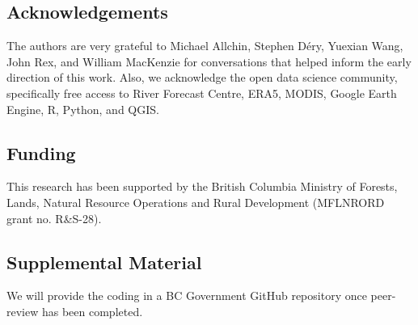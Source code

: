 \documentclass{tATO2e}
\begin{document}
\subsection{Acknowledgements}

The authors are very grateful to Michael Allchin, Stephen Déry, Yuexian Wang, John Rex, and William MacKenzie for conversations that helped inform the early direction of this work. Also, we acknowledge the open data science community, specifically free access to River Forecast Centre, ERA5, MODIS, Google Earth Engine, R, Python, and QGIS. 

\subsection{Funding}

This research has been supported by the British Columbia Ministry of Forests, Lands, Natural Resource Operations and Rural Development (MFLNRORD grant no. R\&S-28).

\subsection{Supplemental Material}

We will provide the coding in a BC Government GitHub repository once peer-review has been completed. 



\end{document}
